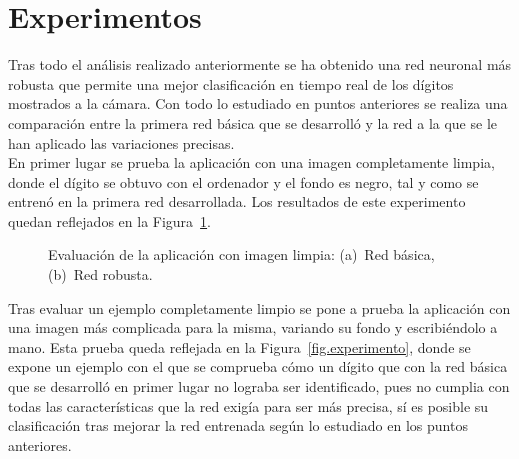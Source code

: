 \section{Experimentos}
Tras todo el análisis realizado anteriormente se ha obtenido una red neuronal más robusta que permite una mejor clasificación en tiempo real de los dígitos mostrados a la cámara. Con todo lo estudiado en puntos anteriores se realiza una comparación entre la primera red básica que se desarrolló y la red a la que se le han aplicado las variaciones precisas.\\

En primer lugar se prueba la aplicación con una imagen completamente limpia, donde el dígito se obtuvo con el ordenador y el fondo es negro, tal y como se entrenó en la primera red desarrollada. Los resultados de este experimento quedan reflejados en la Figura~\ref{fig.experimento1}.

\begin{figure}[H]
	\centering
	 \hspace{5pt}
	\caption{Evaluación de la aplicación con imagen limpia: (a)~Red básica, (b)~Red robusta.}
	\label{fig.experimento1}
\end{figure}

Tras evaluar un ejemplo completamente limpio se pone a prueba la aplicación con una imagen más complicada para la misma, variando su fondo y escribiéndolo a mano. Esta prueba queda reflejada en la Figura~\ref{fig.experimento}, donde se expone un ejemplo con el que se comprueba cómo un dígito que con la red básica que se desarrolló en primer lugar no lograba ser identificado, pues no cumplia con todas las características que la red exigía para ser más precisa, sí es posible su clasificación tras mejorar la red entrenada según lo estudiado en los puntos anteriores. 

